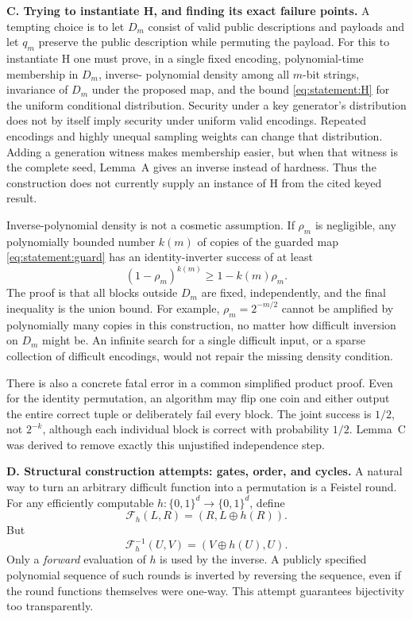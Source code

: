 \documentclass[11pt,a4paper]{article}
\numberwithin{equation}{section}
\begin{document}
\medskip{}
\textbf{C. Trying to instantiate H, and finding its exact failure points.}
A tempting choice is to let $D_m$ consist of valid public descriptions
and payloads and let $q_m$ preserve the public description while
permuting the payload. For this to instantiate H one must prove, in a
single fixed encoding, polynomial-time membership in $D_m$, inverse-
polynomial density among all $m$-bit strings, invariance of $D_m$ under
the proposed map, and the bound \eqref{eq:statement:H} for the uniform
conditional distribution. Security under a key generator's distribution
does not by itself imply security under uniform valid encodings.
Repeated encodings and highly unequal sampling weights can change that
distribution. Adding a generation witness makes membership easier, but
when that witness is the complete seed, Lemma~A gives an inverse instead
of hardness. Thus the construction does not currently supply an
instance of H from the cited keyed result.

Inverse-polynomial density is not a cosmetic assumption. If $\rho_m$
is negligible, any polynomially bounded number $k(m)$ of copies of the
guarded map \eqref{eq:statement:guard} has an identity-inverter success of at
least
\begin{equation}\label{eq:statement:sparse}
 (1-\rho_m)^{k(m)}\ge1-k(m)\rho_m.
\end{equation}
The proof is that all blocks outside $D_m$ are fixed, independently,
and the final inequality is the union bound. For example,
$\rho_m=2^{-m/2}$ cannot be amplified by polynomially many copies in
this construction, no matter how difficult inversion on $D_m$ might be.
An infinite search for a single difficult input, or a sparse collection
of difficult encodings, would not repair the missing density condition.

There is also a concrete fatal error in a common simplified product
proof. Even for the identity permutation, an algorithm may flip one
coin and either output the entire correct tuple or deliberately fail
every block. The joint success is $1/2$, not $2^{-k}$, although each
individual block is correct with probability $1/2$. Lemma~C was derived
to remove exactly this unjustified independence step.

\medskip{}
\textbf{D. Structural construction attempts: gates, order, and cycles.}
A natural way to turn an arbitrary difficult function into a permutation
is a Feistel round. For any efficiently computable
$h:\{0,1\}^d\to\{0,1\}^d$, define
\[
 \mathcal F_h(L,R)=(R,L\mathbin\oplus h(R)).
\]
But
\begin{equation}\label{eq:statement:feistel}
 \mathcal F_h^{-1}(U,V)=(V\mathbin\oplus h(U),U).
\end{equation}
Only a \emph{forward} evaluation of $h$ is used by the inverse. A
publicly specified polynomial sequence of such rounds is inverted by
reversing the sequence, even if the round functions themselves were
one-way. This attempt guarantees bijectivity too transparently.
\end{document}
